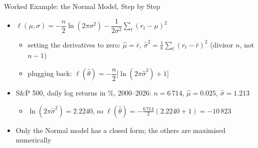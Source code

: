 \begin{frame}{Worked Example: the Normal Model, Step by Step}
\itemsize{\small}
\begin{itemize}
    \item $\ell(\mu, \sigma) = -\dfrac{n}{2}\ln(2\pi\sigma^2) - \dfrac{1}{2\sigma^2}\sum_t (r_t - \mu)^2$
    \begin{itemize}
        \item setting the derivatives to zero: $\hat\mu = \bar r$, $\hat\sigma^2 = \frac{1}{n}\sum_t (r_t - \bar r)^2$ (divisor $n$, not $n - 1$)
        \item plugging back: $\ell(\hat\theta) = -\dfrac{n}{2}\big[\ln(2\pi\hat\sigma^2) + 1\big]$
    \end{itemize}
    \item S\&P 500, daily log returns in \%, 2000--2026: $n = 6\,714$, $\hat\mu = 0.025$, $\hat\sigma = 1.213$
    \begin{itemize}
        \item $\ln(2\pi\hat\sigma^2) = 2.2240$, so $\ell(\hat\theta) = -\frac{6\,714}{2}(2.2240 + 1) = -10\,823$
    \end{itemize}
    \item Only the Normal model has a closed form; the others are maximised numerically
\end{itemize}
\end{frame}

